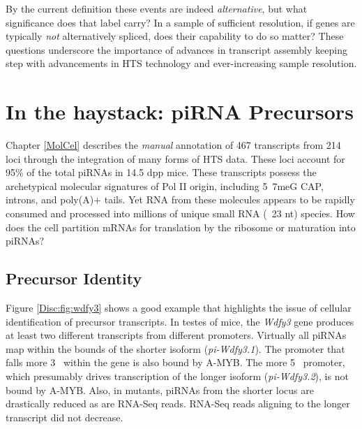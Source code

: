     By the current definition these events are indeed \textit{alternative}, but what significance does that label carry? In a sample of sufficient resolution, if genes are typically \textit{not} alternatively spliced, does their capability to do so matter? These questions underscore the importance of advances in transcript assembly keeping step with advancements in HTS technology and ever-increasing sample resolution.

\section{In the haystack: piRNA Precursors}
  \label{Disc:sec:piRNA precursors}

  Chapter \ref{MolCel} describes the \textit{manual} annotation of 467 transcripts from 214 loci through the integration of many forms of HTS data. These loci account for 95\% of the total piRNAs in 14.5 dpp mice. These transcripts possess the archetypical molecular signatures of Pol II origin, including 5\textprime~7meG CAP, introns, and poly(A)+ tails. Yet RNA from these molecules appears to be rapidly consumed and processed into millions of unique small RNA (~23 nt) species. How does the cell partition mRNAs for translation by the ribosome or maturation into piRNAs?

  \subsection{Precursor Identity}
    \label{Disc:subsec:How are precursors generated}

    Figure \ref{Disc:fig:wdfy3} shows a good example that highlights the issue of cellular identification of precursor transcripts. In testes of mice, the \textit{Wdfy3} gene produces at least two different transcripts from different promoters. Virtually all piRNAs map within the bounds of the shorter isoform (\textit{pi-Wdfy3.1}). The promoter that falls more 3\textprime~ within the gene is also bound by A-MYB. The more 5\textprime~ promoter, which presumably drives transcription of the longer isoform (\textit{pi-Wdfy3.2}), is not bound by A-MYB. Also, in \amyb{} mutants, piRNAs from the shorter locus are drastically reduced as are RNA-Seq reads. RNA-Seq reads aligning to the longer transcript did not decrease.

